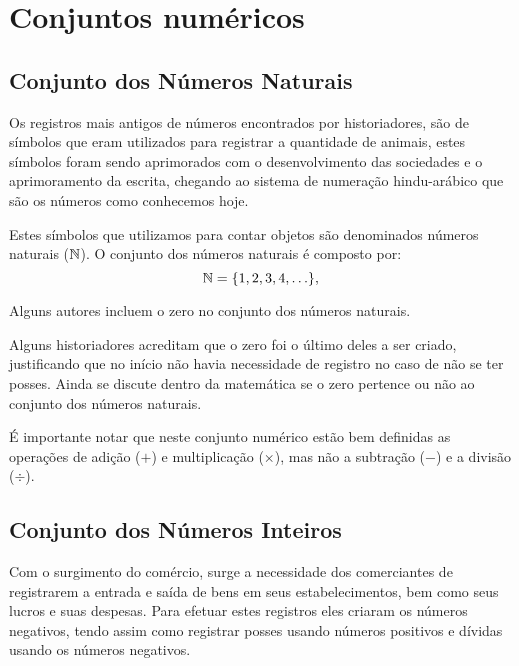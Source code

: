 
\chapter{Conjuntos numéricos}
\section{Conjunto dos Números Naturais}

Os registros mais antigos de números encontrados por historiadores, são de símbolos que eram utilizados para registrar a quantidade de animais, estes símbolos foram sendo aprimorados com o desenvolvimento das sociedades e o aprimoramento da escrita, chegando ao sistema de numeração hindu-arábico que são os números como conhecemos hoje.

Estes símbolos que utilizamos para contar objetos são denominados números naturais ($\mathbb{N}$). O conjunto dos números naturais é composto por:
\begin{equation*}
\mathbb{N}= \{1, 2, 3, 4, \ldots \},
\end{equation*}

Alguns autores incluem o zero no conjunto dos números naturais.

Alguns historiadores acreditam que o zero foi o último deles a ser criado, justificando que no início não havia necessidade de registro no caso de não se ter posses. Ainda se discute dentro da matemática se o zero pertence ou não ao conjunto dos números naturais.

É importante notar que neste conjunto numérico estão bem definidas as operações de adição ($+$) e multiplicação ($\times$), mas não a subtração ($-$) e a divisão ($\div$).

\section{Conjunto dos Números Inteiros}

Com o surgimento do comércio, surge a necessidade dos comerciantes de registrarem a entrada e saída de bens em seus estabelecimentos, bem como seus lucros e suas despesas. Para efetuar estes registros eles criaram os números negativos, tendo assim como registrar posses usando números positivos e dívidas usando os números negativos.

